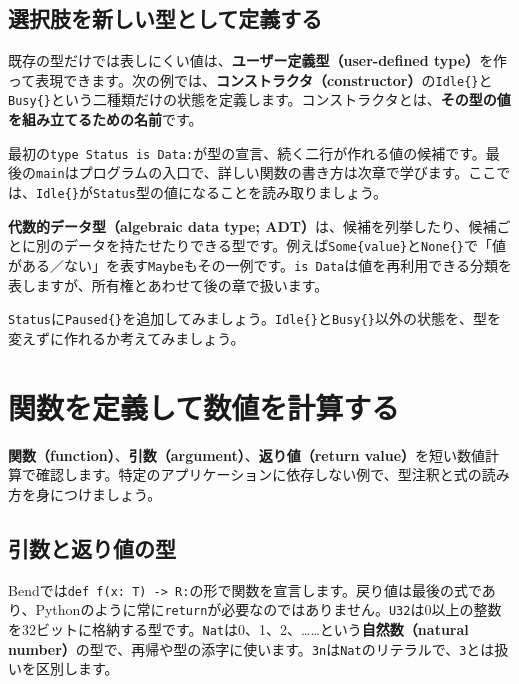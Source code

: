 \documentclass[11pt,a4paper,openany]{book}
\newcommand{\code}[1]{\texttt{#1}}
\newcommand{\term}[1]{\textbf{#1}}
\newcommand{\readcode}[2]{}
\newcommand{\exercise}[1]{\begin{exercisebox}#1\end{exercisebox}}
\begin{document}
\section{選択肢を新しい型として定義する}
既存の型だけでは表しにくい値は、\term{ユーザー定義型（user-defined type）}を作って表現できます。次の例では、\term{コンストラクタ（constructor）}の\code{Idle\{\}}と\code{Busy\{\}}という二種類だけの状態を定義します。コンストラクタとは、\textbf{その型の値を組み立てるための名前}です。
\readcode{28_data_types.bend}{二つの状態を持つデータ型（28\_data\_types.bend）}
最初の\code{type Status is Data:}が型の宣言、続く二行が作れる値の候補です。最後の\code{main}はプログラムの入口で、詳しい関数の書き方は次章で学びます。ここでは、\code{Idle\{\}}が\code{Status}型の値になることを読み取りましょう。
\begin{pointbox}
\term{代数的データ型（algebraic data type; ADT）}は、候補を列挙したり、候補ごとに別のデータを持たせたりできる型です。例えば\code{Some\{value\}}と\code{None\{\}}で「値がある／ない」を表す\code{Maybe}もその一例です。\code{is Data}は値を再利用できる分類を表しますが、所有権とあわせて後の章で扱います。
\end{pointbox}
\exercise{\code{Status}に\code{Paused\{\}}を追加してみましょう。\code{Idle\{\}}と\code{Busy\{\}}以外の状態を、型を変えずに作れるか考えてみましょう。}

\chapter{関数を定義して数値を計算する}
\begin{tcolorbox}[colback=blue!3,colframe=blue!16,boxrule=.35pt,arc=1mm,left=3mm,right=3mm,top=2mm,bottom=2mm]
\small \term{関数（function）}、\term{引数（argument）}、\term{返り値（return value）}を短い数値計算で確認します。特定のアプリケーションに依存しない例で、型注釈と式の読み方を身につけましょう。
\end{tcolorbox}

\section{引数と返り値の型}
Bendでは\code{def f(x: T) -> R:}の形で関数を宣言します。戻り値は最後の式であり、Pythonのように常に\code{return}が必要なのではありません。\code{U32}は0以上の整数を32ビットに格納する型です。\code{Nat}は0、1、2、……という\term{自然数（natural number）}の型で、再帰や型の添字に使います。\code{3n}は\code{Nat}のリテラルで、\code{3}とは扱いを区別します。
\end{document}

